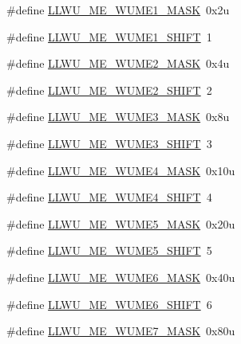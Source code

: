 \begin{DoxyCompactItemize}
\item 
\#define \hyperlink{group___l_l_w_u___register___masks_ga99b29643134140d21a3d4259b7f64c86}{L\+L\+W\+U\+\_\+\+M\+E\+\_\+\+W\+U\+M\+E1\+\_\+\+M\+A\+SK}~0x2u
\item 
\#define \hyperlink{group___l_l_w_u___register___masks_gac623d0db3076972370ee795830b555c1}{L\+L\+W\+U\+\_\+\+M\+E\+\_\+\+W\+U\+M\+E1\+\_\+\+S\+H\+I\+FT}~1
\item 
\#define \hyperlink{group___l_l_w_u___register___masks_ga9f19f501dd2ad4aa2f7b01ac8edf8056}{L\+L\+W\+U\+\_\+\+M\+E\+\_\+\+W\+U\+M\+E2\+\_\+\+M\+A\+SK}~0x4u
\item 
\#define \hyperlink{group___l_l_w_u___register___masks_ga383c567df0dbc9edf2773d29676a7b30}{L\+L\+W\+U\+\_\+\+M\+E\+\_\+\+W\+U\+M\+E2\+\_\+\+S\+H\+I\+FT}~2
\item 
\#define \hyperlink{group___l_l_w_u___register___masks_ga6f6ea286130568de4df073a50fbdc282}{L\+L\+W\+U\+\_\+\+M\+E\+\_\+\+W\+U\+M\+E3\+\_\+\+M\+A\+SK}~0x8u
\item 
\#define \hyperlink{group___l_l_w_u___register___masks_ga394f6049d44881fafbc58b62e3ea8f44}{L\+L\+W\+U\+\_\+\+M\+E\+\_\+\+W\+U\+M\+E3\+\_\+\+S\+H\+I\+FT}~3
\item 
\#define \hyperlink{group___l_l_w_u___register___masks_ga4b7fa4566d64069e93d5bf9bf69efcf4}{L\+L\+W\+U\+\_\+\+M\+E\+\_\+\+W\+U\+M\+E4\+\_\+\+M\+A\+SK}~0x10u
\item 
\#define \hyperlink{group___l_l_w_u___register___masks_gad162d87bd892f7bfcd34c74941168e64}{L\+L\+W\+U\+\_\+\+M\+E\+\_\+\+W\+U\+M\+E4\+\_\+\+S\+H\+I\+FT}~4
\item 
\#define \hyperlink{group___l_l_w_u___register___masks_gadeab309cd88e84e94433398ea4656511}{L\+L\+W\+U\+\_\+\+M\+E\+\_\+\+W\+U\+M\+E5\+\_\+\+M\+A\+SK}~0x20u
\item 
\#define \hyperlink{group___l_l_w_u___register___masks_ga8eb531aa288bc7d32d75950b7bf9b1a5}{L\+L\+W\+U\+\_\+\+M\+E\+\_\+\+W\+U\+M\+E5\+\_\+\+S\+H\+I\+FT}~5
\item 
\#define \hyperlink{group___l_l_w_u___register___masks_ga4f4902c05f5e93174a1ef5afaa426d01}{L\+L\+W\+U\+\_\+\+M\+E\+\_\+\+W\+U\+M\+E6\+\_\+\+M\+A\+SK}~0x40u
\item 
\#define \hyperlink{group___l_l_w_u___register___masks_gaba71957dbca47b2dd3aaec44106b013e}{L\+L\+W\+U\+\_\+\+M\+E\+\_\+\+W\+U\+M\+E6\+\_\+\+S\+H\+I\+FT}~6
\item 
\#define \hyperlink{group___l_l_w_u___register___masks_ga455f995ef197eea9796910ff1b7327a0}{L\+L\+W\+U\+\_\+\+M\+E\+\_\+\+W\+U\+M\+E7\+\_\+\+M\+A\+SK}~0x80u

\end{DoxyCompactItemize}
